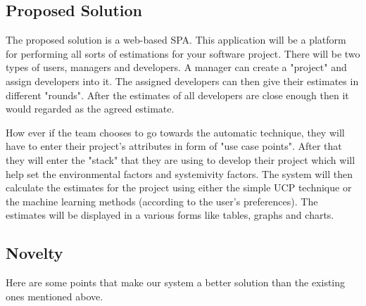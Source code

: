 \subsection{Proposed Solution}
The proposed solution is a web-based SPA. This application will be a platform for performing all sorts of estimations for your software project. There will be two types of users, managers and developers. A manager can create a "project" and assign developers into it. The assigned developers can then give their estimates in different "rounds". After the estimates of all developers are close enough then it would regarded as the agreed estimate.

How ever if the team chooses to go towards the automatic technique, they will have to enter their project's attributes in form of "use case points". After that they will enter the "stack" that they are using to develop their project which will help set the environmental factors and systemivity factors. The system will then calculate the estimates for the project using either the simple UCP technique or the machine learning methods (according to the user's preferences). The estimates will be displayed in a various forms like tables, graphs and charts.







\subsection{Novelty}
Here are some points that make our system a better solution than the existing ones mentioned above.

